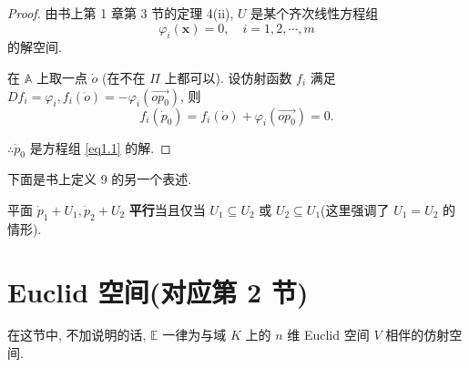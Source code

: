 \documentclass[color=black,device=normal,lang=cn,mode=geye]{elegantnote}
\begin{document}
\begin{proof}
    由书上第 1 章第 3 节的定理 4(ii), $U$ 是某个齐次线性方程组
    \[\varphi_i(\boldsymbol{x})=0,\quad i=1,2,\cdots,m\]
    的解空间.

    在 $\mathbb{A}$ 上取一点 $\dot{o}$ (在不在 $\varPi$ 上都可以). 设仿射函数 $f_i$ 满足 $Df_i=\varphi_i,f_i(\dot{o})=-\varphi_i(\overrightarrow{op_0})$, 则
    \[f_i(\dot{p}_0)=f_i(\dot{o})+\varphi_i(\overrightarrow{op_0})=0.\]

    $\therefore\dot{p}_0$ 是方程组 \ref{eq1.1} 的解.
\end{proof}
下面是书上定义 9 的另一个表述.
\begin{definition}
    平面 $\dot{p}_1+U_1,\dot{p}_2+U_2$ \textbf{平行}当且仅当 $U_1\subseteq U_2$ 或 $U_2\subseteq U_1$(这里强调了 $U_1=U_2$ 的情形).
\end{definition}
\section{Euclid 空间(对应第 2 节)}
在这节中, 不加说明的话, $\mathbb{E}$ 一律为与域 $K$ 上的 $n$ 维 Euclid 空间 $V$ 相伴的仿射空间.
\end{document}
